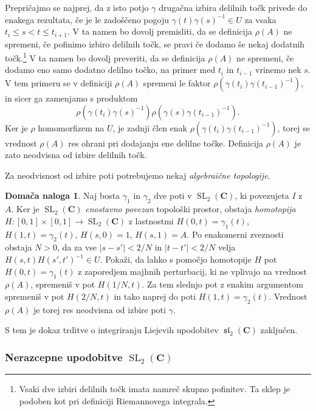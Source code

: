 \documentclass[11pt]{book}
\def\CC{\mathbf{C}}
\DeclareMathOperator\slfrak{\mathfrak{sl}}
\DeclareMathOperator\SL{SL}
\theoremstyle{definition}
\theoremstyle{zgled}
\theoremstyle{odprtproblem}
\theoremstyle{domacanaloga}
\newtheorem*{domacanaloga}{Domača naloga}
\theoremstyle{izrek}
\begin{document}
Prepričajmo se najprej, da z isto potjo $\gamma$ drugačna izbira delilnih točk privede do enakega rezultata, če je le zadoščeno pogoju $\gamma(t) \gamma(s)^{-1} \in U$ za vsaka $t_i \leq s < t \leq t_{i+1}$. V ta namen bo dovolj premisliti, da se definicija $\rho(A)$ ne spremeni, če pofinimo izbiro delilnih točk, se pravi če dodamo še nekaj dodatnih točk.\footnote{Vsaki dve izbiri delilnih točk imata namreč skupno pofinitev. Ta sklep je podoben kot pri definiciji Riemannovega integrala.} V ta namen bo dovolj preveriti, da se definicija $\rho(A)$ ne spremeni, če dodamo eno samo dodatno delilno točko, na primer med $t_i$ in $t_{i-1}$ vrinemo nek $s$. V tem primeru se v definiciji $\rho(A)$ spremeni le faktor $\rho(\gamma(t_i) \gamma(t_{i-1})^{-1})$, in sicer ga zamenjamo s produktom
\[
    \rho(\gamma(t_i) \gamma(s)^{-1}) 
    \rho(\gamma(s) \gamma(t_{i-1})^{-1}).
\]
Ker je $\rho$ homomorfizem na $U$, je zadnji člen enak $\rho(\gamma(t_i) \gamma(t_{i-1})^{-1})$, torej se vrednost $\rho(A)$ res ohrani pri dodajanju ene delilne točke. Definicija $\rho(A)$ je zato neodvisna od izbire delilnih točk.

Za neodvisnost od izbire poti potrebujemo nekaj \emph{algebraične topologije}.

\begin{domacanaloga}
Naj bosta $\gamma_1$ in $\gamma_2$ dve poti v $\SL_2(\CC)$, ki povezujeta $I$ z $A$. Ker je $\SL_2(\CC)$ \emph{enostavno povezan} topološki prostor, obstaja \emph{homotopija} $H \colon [0,1] \times [0,1] \to \SL_2(\CC)$ z lastnostmi $H(0,t) = \gamma_1(t)$, $H(1,t) = \gamma_2(t)$, $H(s, 0) = 1$, $H(s,1) = A$. Po enakomerni zveznosti obstaja $N > 0$, da za vse $| s - s' | < 2/N$ in $| t - t'| < 2/N$ velja $H(s,t)H(s',t')^{-1} \in U$. Pokaži, da lahko s pomočjo homotopije $H$ pot $H(0,t) = \gamma_1(t)$ z zaporedjem majhnih perturbacij, ki ne vplivajo na vrednost $\rho(A)$, spremeniš v pot $H(1/N, t)$. Za tem slednjo pot z enakim argumentom spremeniš v pot $H(2/N, t)$ in tako naprej do poti $H(1,t) = \gamma_2(t)$. Vrednost $\rho(A)$ je torej res neodvisna od izbire poti $\gamma$.
\end{domacanaloga}

S tem je dokaz trditve o integriranju Liejevih upodobitev $\slfrak_2(\CC)$ zaključen. 

\subsubsection{Nerazcepne upodobitve $\SL_2(\CC)$}
\end{document}
